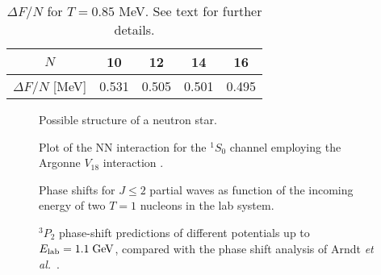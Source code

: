 \documentclass[preprint,rmp,aps,floatfix]{revtex4}
\begin{document}
\begin{table}[b]
\caption{ $\Delta F/N$ for $T=0.85$ MeV. 
See text for further details. \label{tab:free_energy10_16}} 
\begin{tabular}{ccccc}\hline
$N$ & 10 & 12 & 14& 16 \\ \hline
$\Delta F/N$ [MeV]   &0.531 & 0.505 & 0.501 & 0.495 \\\hline
\end{tabular} 

\end{table}



\begin{figure}
   \caption{Possible structure of a neutron star.}
   \label{fig:sec1fig_phases}
\end{figure}

\begin{figure}
\caption{Plot of the NN interaction for the 
         $^1S_0$ channel employing the Argonne $V_{18}$ interaction
         \cite{v18}.
             \label{fig:singletspot_sec2}}
\end{figure}

\begin{figure}
\caption{Phase shifts for $J\leq 2$  partial waves as function of
         the incoming energy of two $T=1$ nucleons in the lab system.
         \label{fig:t1partialwaves}}
\end{figure} 

\begin{figure}
\caption{$^3P_2$ phase-shift predictions of different potentials
         up to $E_{\rm lab}=1.1\;{\rm GeV}$, compared with the
         phase shift analysis of Arndt {\em et al.}~\protect\cite{arndt97}.}
\label{fig:3p2phaseshift}
\end{figure}
\end{document}
